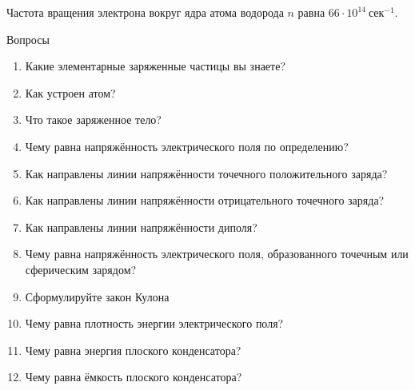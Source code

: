 \documentclass[a5paper, 10pt]{diss_4}
\renewcommand{\'}{\,'}
\begin{document}
 Частота вращения электрона вокруг ядра атома водорода $n$ равна
$66\cdot10^{14}\ сек^{-1}$.

\begin{center}
Вопросы
\end{center}
\begin{enumerate}
\item Какие элементарные заряженные частицы вы знаете?
\item Как устроен атом?
\item Что такое заряженное тело?
\item Чему равна напряжённость электрического поля по определению?
\item Как направлены линии напряжённости точечного положительного заряда?
\item Как направлены линии напряжённости отрицательного точечного заряда?
\item Как направлены линии напряжённости диполя?
\item Чему равна напряжённость электрического поля, образованного точечным или сферическим зарядом?
\item Сформулируйте закон Кулона

\item Чему равна плотность энергии электрического поля?

\item Чему равна энергия плоского конденсатора?

\item Чему равна ёмкость плоского конденсатора?
\end{enumerate}
\end{document}
